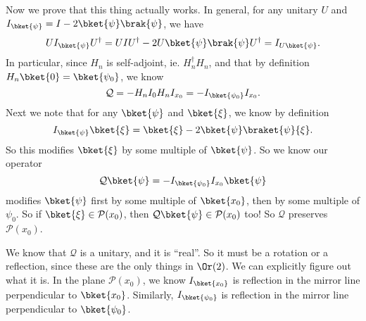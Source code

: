 \documentclass[a4paper]{article}
\begin{document}
Now we prove that this thing actually works. In general, for any unitary $U$ and $I_{\bket{\psi}} = I - 2 \bket{\psi}\brak{\psi}$, we have
\[
  UI_{\bket{\psi}}U^\dagger = UIU^\dagger - 2U \bket{\psi} \brak{\psi} U^\dagger = I_{U \bket{\psi}}.
\]
In particular, since $H_n$ is self-adjoint, ie. $H_n^\dagger H_n$, and that by definition $H_n \bket{0} = \bket{\psi_0}$, we know
\[
  \mathcal{Q} = -H_n I_0 H_n I_{x_0} = -I_{\bket{\psi_0}} I_{x_0}.
\]
Next we note that for any $\bket{\psi}$ and $\bket{\xi}$, we know by definition
\[
  I_{\bket{\psi}}\bket{\xi} = \bket{\xi} - 2 \bket{\psi} \braket{\psi}{\xi}.
\]
So this modifies $\bket{\xi}$ by some multiple of $\bket{\psi}$. So we know our operator
\[
  \mathcal{Q}\bket{\psi} = -I_{\bket{\psi_0}} I_{x_0}\bket{\psi}
\]
modifies $\bket{\psi}$ first by some multiple of $\bket{x_0}$, then by some multiple of $\psi_0$. So if $\bket{\xi} \in \mathcal{P}(x_0)$, then $\mathcal{Q} \bket{\psi} \in \mathcal{P}(x_0)$ too! So $\mathcal{Q}$ preserves $\mathcal{P}(x_0)$.

We know that $\mathcal{Q}$ is a unitary, and it is ``real''. So it must be a rotation or a reflection, since these are the only things in $\Or(2)$. We can explicitly figure out what it is. In the plane $\mathcal{P}(x_0)$, we know $I_{\bket{x_0}}$ is reflection in the mirror line perpendicular to $\bket{x_0}$. Similarly, $I_{\bket{\psi_0}}$ is reflection in the mirror line perpendicular to $\bket{\psi_0}$.
\end{document}

